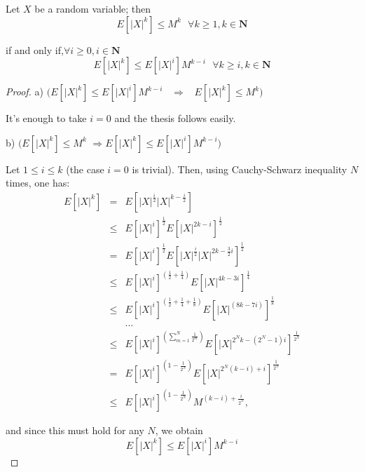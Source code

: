 \documentclass[12pt]{article}
\begin{document}
Let $X$ be a random variable; then%
\[
E[\left\vert X\right\vert ^{k}]\leq M^{k}\text{ \ \ \ \ \ \ }\forall k\geq
1,k\in \mathbf{N}
\]

\bigskip if and only if,$\forall i\geq 0,i\in \mathbf{N}$ 
\[
E\left[ \left\vert X\right\vert ^{k}\right] \leq E\left[ \left\vert
X\right\vert ^{i}\right] M^{k-i}\text{ \ \ \ \ \ \ \ }\forall k\geq i,k\in \mathbf{N}
\]

\bigskip 

\begin{proof}


a) $(E\left[ \left\vert X\right\vert ^{k}\right] \leq E\left[
\left\vert X\right\vert ^{i}\right] M^{k-i}$ \ $\Longrightarrow $ \ $%
E[\left\vert X\right\vert ^{k}]\leq M^{k})$

It's enough to take $i=0$ and the thesis follows easily.

\bigskip 

b)  $(E[\left\vert X\right\vert ^{k}]\leq M^{k}$ $\Longrightarrow E\left[
\left\vert X\right\vert ^{k}\right] \leq E\left[ \left\vert X\right\vert ^{i}%
\right] M^{k-i})$

Let $1\leq i\leq k$ (the case $i=0$ is trivial). Then, using Cauchy-Schwarz
inequality $N$ times, one has:%
\begin{eqnarray*}
E[\left\vert X\right\vert ^{k}] &=&E\left[ \left\vert X\right\vert ^{\frac{i%
}{2}}\left\vert X\right\vert ^{k-\frac{i}{2}}\right]  \\
&\leq &E\left[ \left\vert X\right\vert ^{i}\right] ^{\frac{1}{2}}E\left[
\left\vert X\right\vert ^{2k-i}\right] ^{\frac{1}{2}} \\
&=&E\left[ \left\vert X\right\vert ^{i}\right] ^{\frac{1}{2}}E\left[
\left\vert X\right\vert ^{\frac{i}{2}}\left\vert X\right\vert ^{2k-\frac{3}{2%
}i}\right] ^{\frac{1}{2}} \\
&\leq &E\left[ \left\vert X\right\vert ^{i}\right] ^{\left( \frac{1}{2}+%
\frac{1}{4}\right) }E\left[ \left\vert X\right\vert ^{4k-3i}\right] ^{\frac{1%
}{4}} \\
&\leq &E\left[ \left\vert X\right\vert ^{i}\right] ^{\left( \frac{1}{2}+%
\frac{1}{4}+\frac{1}{8}\right) }E\left[ \left\vert X\right\vert ^{\left(
8k-7i\right) }\right] ^{\frac{1}{8}} \\
&&... \\
&\leq &E\left[ \left\vert X\right\vert ^{i}\right] ^{\left( \sum_{m=1}^{N}%
\frac{1}{2^{m}}\right) }E\left[ \left\vert X\right\vert ^{2^{N}k-\left(
2^{N}-1\right) i}\right] ^{\frac{1}{2^{N}}} \\
&=&E\left[ \left\vert X\right\vert ^{i}\right] ^{\left( 1-\frac{1}{2^{N}}%
\right) }E\left[ \left\vert X\right\vert ^{2^{N}\left( k-i\right) +i}\right]
^{\frac{1}{2^{N}}} \\
&\leq &E\left[ \left\vert X\right\vert ^{i}\right] ^{\left( 1-\frac{1}{2^{N}}%
\right) }M^{\left( k-i\right) +\frac{i}{2^{N}}},
\end{eqnarray*}

and since this must hold for any $N$, we obtain
\[
E[\left\vert X\right\vert ^{k}]\leq E\left[ \left\vert X\right\vert ^{i}%
\right] M^{k-i}
\]
\end{proof}
\end{document}
